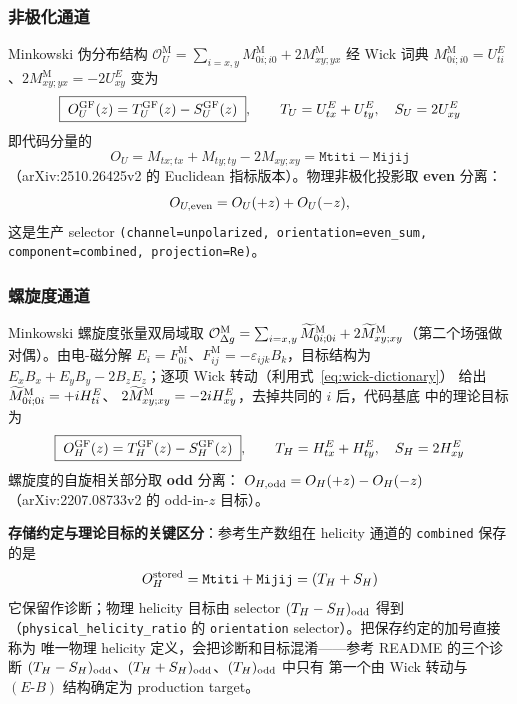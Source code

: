 \documentclass[11pt,a4paper]{ctexart}
\newcommand{\eps}{\varepsilon}
\newcommand{\code}[1]{\texttt{#1}}
\begin{document}
\subsubsection{非极化通道}

Minkowski 伪分布结构 $\mathcal O_U^{\mathrm M}
=\sum_{i=x,y}M^{\mathrm M}_{0i;i0}+2M^{\mathrm M}_{xy;yx}$ 经 Wick 词典
$M^{\mathrm M}_{0i;i0}=U^E_{ti}$、$2M^{\mathrm M}_{xy;yx}=-2U^E_{xy}$ 变为
\begin{equation}\label{eq:unpol-combination}
\boxed{\;O_U^{\rm GF}(z) = T_U^{\rm GF}(z)-S_U^{\rm GF}(z)\;},
\qquad
T_U=U^E_{tx}+U^E_{ty},\quad S_U=2U^E_{xy}
\end{equation}
即代码分量的
\begin{equation}
O_U = M_{tx;tx}+M_{ty;ty}-2M_{xy;xy} = \code{Mtiti}-\code{Mijij}
\end{equation}
（arXiv:2510.26425v2 的 Euclidean 指标版本）。物理非极化投影取
\textbf{even} 分离：
\begin{equation}\label{eq:even-odd}
O_{U,\rm even} = O_U(+z) + O_U(-z),
\end{equation}
这是生产 selector
\code{(channel=unpolarized, orientation=even\_sum,
component=combined, projection=Re)}。

\subsubsection{螺旋度通道}

Minkowski 螺旋度张量双局域取
$\mathcal O_{\Delta g}^{\rm M}=\sum_{i=x,y}\widetilde M^{\rm M}_{0i;0i}
+2\widetilde M^{\rm M}_{xy;xy}$（第二个场强做对偶）。由电-磁分解
$E_i=F^{\mathrm M}_{0i}$、$F^{\mathrm M}_{ij}=-\eps_{ijk}B_k$，目标结构为
$E_xB_x+E_yB_y-2B_zE_z$；逐项 Wick 转动（利用式~\eqref{eq:wick-dictionary}）
给出 $\widetilde M^{\rm M}_{0i;0i}=+iH^E_{ti}$、
$2\widetilde M^{\rm M}_{xy;xy}=-2iH^E_{xy}$，去掉共同的 $i$ 后，代码基底
中的理论目标为
\begin{equation}\label{eq:hel-physical}
\boxed{\;O_H^{\rm GF}(z)=T_H^{\rm GF}(z)-S_H^{\rm GF}(z)\;},
\qquad
T_H=H^E_{tx}+H^E_{ty},\quad S_H=2H^E_{xy}
\end{equation}
螺旋度的自旋相关部分取 \textbf{odd} 分离：
$O_{H,\rm odd}=O_H(+z)-O_H(-z)$（arXiv:2207.08733v2 的 odd-in-$z$ 目标）。

\textbf{存储约定与理论目标的关键区分}：参考生产数组在 helicity 通道的
\code{combined} 保存的是
\begin{equation}
O_H^{\rm stored} = \code{Mtiti}+\code{Mijij} = (T_H+S_H)
\end{equation}
它保留作诊断；物理 helicity 目标由 selector
$(T_H-S_H)_{\rm odd}$ 得到（\code{physical\_helicity\_ratio} 的
\code{orientation} selector）。把保存约定的加号直接称为
唯一物理 helicity 定义，会把诊断和目标混淆——参考 README 的三个诊断
$(T_H-S_H)_{\rm odd}$、$(T_H+S_H)_{\rm odd}$、$(T_H)_{\rm odd}$ 中只有
第一个由 Wick 转动与 $(E\text{-}B)$ 结构确定为 production target。
\end{document}

